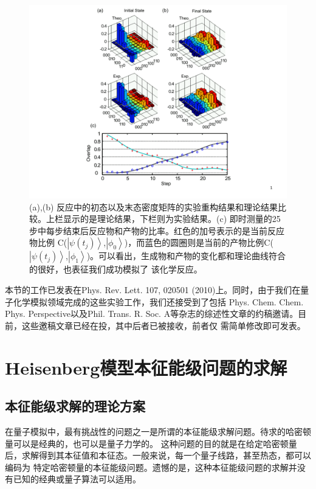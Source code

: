   \begin{figure}[htbp]
            \begin{center}
              \includegraphics[width= 0.7\columnwidth]{figures/nmrdymcurve.pdf}
              \caption{(a),(b) 反应中的初态以及末态密度矩阵的实验重构结果和理论结果比较。上栏显示的是理论结果，下栏则为实验结果。(c) 即时测量的25步中每步结束后反应物和产物的比率。红色的加号表示的是当前反应物比例
              C($\left\vert \psi(t_j)\right\rangle$,$\left\vert \phi_{0} \right\rangle$)，而蓝色的圆圈则是当前的产物比例C($\left\vert \psi(t_j) \right\rangle$,$\left\vert \phi_{1} \right\rangle$)。可以看出，生成物和产物的变化都和理论曲线符合的很好，也表征我们成功模拟了
              该化学反应。}\label{nmrdymcurve}
            \end{center}
 \end{figure}

本节的工作已发表在Phys. Rev. Lett. 107, 020501 (2010)\cite{dynamical}上。同时，由于我们在量子化学模拟领域完成的这些实验工作，我们还接受到了包括
Phys. Chem. Chem. Phys. Perspective以及Phil. Trans. R. Soc. A等杂志的综述性文章的约稿邀请。目前，这些邀稿文章已经在投，其中后者已被接收\cite{invited1}，前者仅
需简单修改即可发表\cite{invited2}。

\section{Heisenberg模型本征能级问题的求解}

\subsection{本征能级求解的理论方案}

在量子模拟中，最有挑战性的问题之一是所谓的本征能级求解问题。待求的哈密顿量可以是经典的，也可以是量子力学的。
这种问题的目的就是在给定哈密顿量后，求解得到其本征值和本征态。一般来说，每一个量子线路\cite{heisen1}，甚至热态\cite{heisen2,heisen3}，都可以编码为
特定哈密顿量的本征能级问题。遗憾的是，这种本征能级问题的求解并没有已知的经典或量子算法可以适用。

